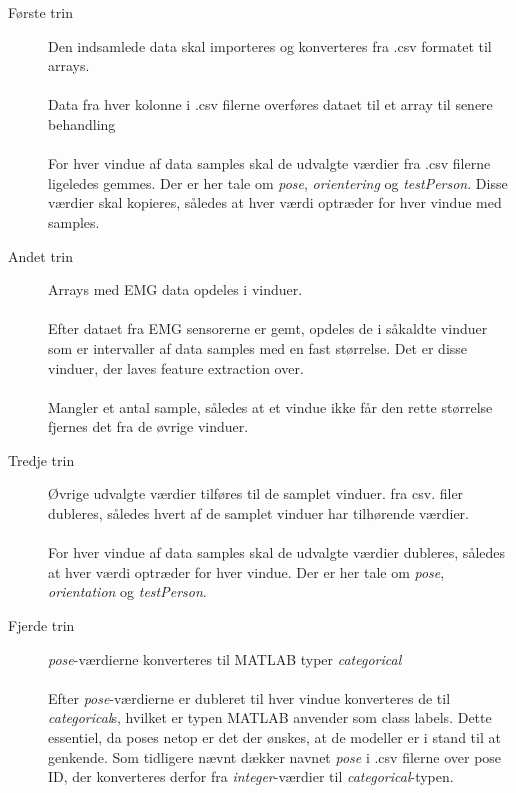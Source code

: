 \begin{description}
	\item[Første trin] Den indsamlede data skal importeres og konverteres fra .csv formatet til arrays.\\\\
		Data fra hver kolonne i .csv filerne overføres dataet til et array til senere behandling
	\\\\
	For hver vindue af data samples skal de udvalgte værdier fra .csv filerne ligeledes gemmes. Der er her tale om \textit{pose}, \textit{orientering} og \textit{testPerson}. Disse værdier skal kopieres, således at hver værdi optræder for hver vindue med samples.

  \item[Andet trin] Arrays med EMG data opdeles i vinduer. 
  \\\\
  Efter dataet fra EMG sensorerne er gemt, opdeles de i såkaldte vinduer som er intervaller af data samples med en fast størrelse. Det er disse vinduer, der laves feature extraction over.
  \\\\
  Mangler et antal sample, således at et vindue ikke får den rette størrelse fjernes det fra de øvrige vinduer. 
    \item[Tredje trin] Øvrige udvalgte værdier tilføres til de samplet vinduer.
     fra csv. filer dubleres, således hvert af de samplet vinduer har tilhørende værdier.
  \\\\
  For hver vindue af data samples skal de udvalgte værdier dubleres, således at hver værdi optræder for hver vindue. Der er her tale om \textit{pose}, \textit{orientation} og \textit{testPerson}.
  
  \item[Fjerde trin] \textit{pose}-værdierne konverteres til MATLAB typer \textit{categorical}
  \\\\
  Efter \textit{pose}-værdierne er dubleret til hver vindue konverteres de til \textit{categorical}s, hvilket er typen MATLAB anvender som class labels. Dette essentiel, da poses netop er det der ønskes, at de modeller er i stand til at genkende. Som tidligere nævnt dækker navnet \textit{pose} i .csv filerne over pose ID, der konverteres derfor fra \textit{integer}-værdier til \textit{categorical}-typen. 
\end{description}


